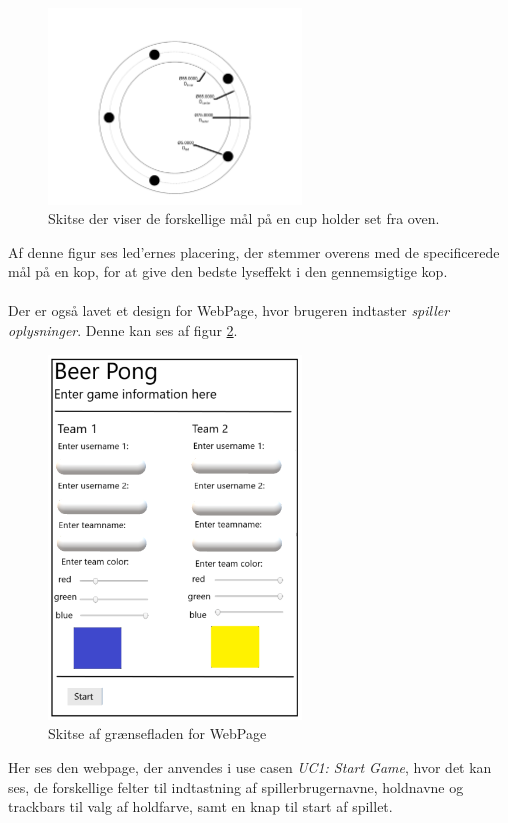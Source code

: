 \documentclass[Rapport/Rapport_main.tex]{subfiles}
\begin{document}
\begin{figure}[H]
    \centering
    \includegraphics[width=0.6\textwidth,trim={2in 0.4in 2in 1.3in},clip, page=1]{Kravspecifikation/Ikke-funktionelle/graphics/LEDplacement.pdf}
    \caption{Skitse der viser de forskellige mål på en cup holder set fra oven.}
    \label{fig:rap_LEDplacement}
\end{figure}
Af denne figur ses led'ernes placering, der stemmer overens med de specificerede mål på en kop, for at give den bedste lyseffekt i den gennemsigtige kop.\\\\
Der er også lavet et design for WebPage, hvor brugeren indtaster \textit{spiller oplysninger}. Denne kan ses af figur \ref{fig:rap_webpage_sketch}.

\begin{figure}[H]
    \centering
    \includegraphics[width=0.6\textwidth]{Kravspecifikation/Ikke-funktionelle/graphics/WebPage_IF.png}
    \caption{Skitse af grænsefladen for WebPage}
   \label{fig:rap_webpage_sketch}
\end{figure}

Her ses den webpage, der anvendes i use casen \textit{UC1: Start Game}, hvor det kan ses, de forskellige felter til indtastning af spillerbrugernavne, holdnavne og trackbars til valg af holdfarve, samt en knap til start af spillet.
\end{document}
